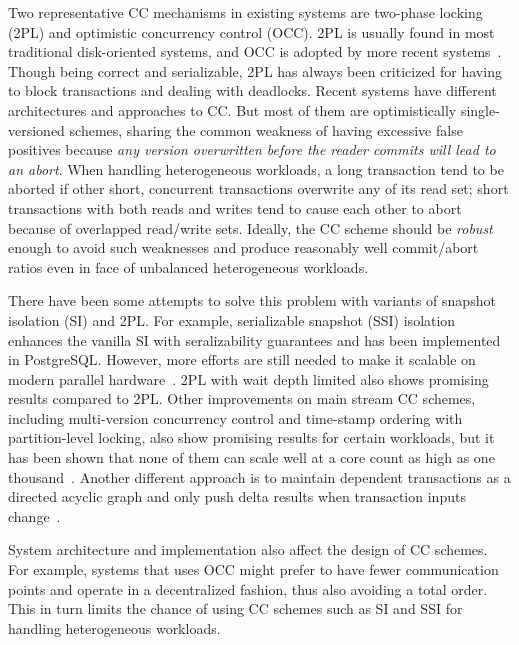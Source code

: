\documentclass[preprint]{sig-alternate-nocprt}
\begin{document}
Two representative CC mechanisms in existing systems are two-phase locking (2PL) and optimistic concurrency control (OCC). 2PL is usually found in most traditional disk-oriented systems, and OCC is adopted by more recent systems~\cite{Hekaton,Silo}. Though being correct and serializable, 2PL has always been criticized for having to block transactions and dealing with deadlocks. Recent systems have different architectures and approaches to CC. But most of them are optimistically single-versioned schemes, sharing the common weakness of having excessive false positives because \textit{any version overwritten before the reader commits will lead to an abort}. When handling heterogeneous workloads, a long transaction tend to be aborted if other short, concurrent transactions overwrite any of its read set; short transactions with both reads and writes tend to cause each other to abort because of overlapped read/write sets. Ideally, the CC scheme should be \textit{robust} enough to avoid such weaknesses and produce reasonably well commit/abort ratios even in face of unbalanced heterogeneous workloads.

There have been some attempts to solve this problem with variants of snapshot isolation (SI) and 2PL. For example, serializable snapshot (SSI) isolation~\cite{SSI} enhances the vanilla SI with seralizability guarantees and has been implemented in PostgreSQL. However, more efforts are still needed to make it scalable on modern parallel hardware~\cite{ScalableSSI}. 2PL with wait depth limited also shows promising results compared to 2PL. Other improvements on main stream CC schemes, including multi-version concurrency control and time-stamp ordering with partition-level locking, also show promising results for certain workloads, but it has been shown that none of them can scale well at a core count as high as one thousand~\cite{CCAbyss}. Another different approach is to maintain dependent transactions as a directed acyclic graph and only push delta results when transaction inputs change~\cite{LogicBlox}.

System architecture and implementation also affect the design of CC schemes. For example, systems that uses OCC might prefer to have fewer communication points and operate in a decentralized fashion, thus also avoiding a total order. This in turn limits the chance of using CC schemes such as SI and SSI for handling heterogeneous workloads.
\end{document}
